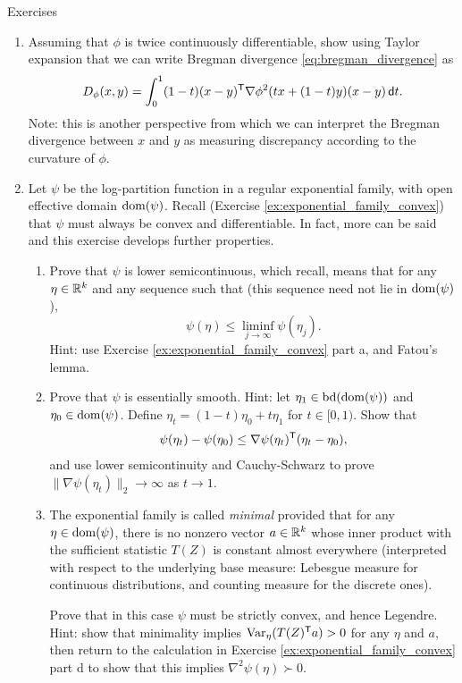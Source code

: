 \begin{xcb}{Exercises}
\begin{enumerate}[label=\thechapter.\arabic*]
\item Assuming that $\phi$ is twice continuously differentiable, show using
  Taylor expansion that we can write Bregman divergence
  \eqref{eq:bregman_divergence} as 
  \[
  D_\phi(x,y) = \int_0^1 (1-t) (x-y)^{\mathsf{T}} \nabla \phi^2(tx + (1-t)y) (x-y) \,
  \mathsf{d}{t}.  
  \]
  Note: this is another perspective from which we can interpret the Bregman
  divergence between $x$ and $y$ as measuring discrepancy according to the
  curvature of $\phi$.  

\item \label{ex:exponential_family_legendre}
  Let $\psi$ be the log-partition function in a regular exponential family,
  with open effective domain $\operatorname{dom}(\psi)$. Recall (Exercise
  \ref{ex:exponential_family_convex}) that $\psi$ must always be convex and        
  differentiable. In fact, more can be said and this exercise develops further
  properties.     

\begin{enumerate}[label=\alph*.]
\item Prove that $\psi$ is lower semicontinuous, which recall, means that for
  any $\eta \in \mathbb{R}^k$ and any sequence such that  (this sequence need not lie in $\operatorname{dom}(\psi)$), 
  \[
  \psi(\eta) \leq \liminf_{j \to \infty} \psi(\eta_j). 
  \]
  Hint: use Exercise \ref{ex:exponential_family_convex} part a, and Fatou's
  lemma. 

\item Prove that $\psi$ is essentially smooth. Hint: let $\eta_1 \in
  \operatorname{bd}(\operatorname{dom}(\psi))$ and $\eta_0 \in \operatorname{dom}(\psi)$. Define $\eta_t = (1-t) 
  \eta_0 + t \eta_1$ for $t \in [0,1)$. Show that  
  \[
  \psi(\eta_t) - \psi(\eta_0) \leq \nabla\psi(\eta_t)^{\mathsf{T}} (\eta_t - \eta_0), 
  \]
  and use lower semicontinuity and Cauchy-Schwarz to prove
  $\|\nabla\psi(\eta_t)\|_2 \to \infty$ as $t \to 1$.  

\item The exponential family is called \emph{minimal} provided that for any  
  $\eta \in \operatorname{dom}(\psi)$, there is no nonzero vector $a \in \mathbb{R}^k$ whose inner
  product with the sufficient statistic $T(Z)$ is constant almost everywhere 
  (interpreted with respect to the underlying base measure: Lebesgue measure for 
  continuous distributions, and counting measure for the discrete ones).   

  Prove that in this case $\psi$ must be strictly convex, and hence
  Legendre. Hint: show that minimality implies $\operatorname{Var}_\eta(T(Z)^{\mathsf{T}} a) > 0$ for
  any $\eta$ and $a$, then return to the calculation in Exercise
  \ref{ex:exponential_family_convex} part d to show that this implies $\nabla^2
  \psi(\eta) \succ 0$.  
\end{enumerate}


\end{enumerate}
\end{xcb}
